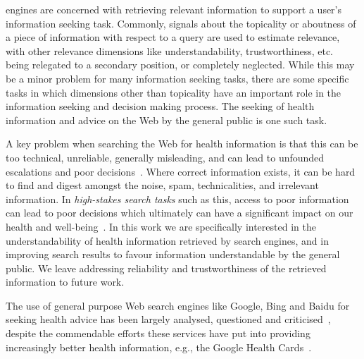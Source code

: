 
 engines are concerned with retrieving relevant information to support a user's information seeking task. Commonly, signals about the topicality or aboutness of a piece of information with respect to a query are used to estimate relevance, with other relevance dimensions like understandability, trustworthiness, etc.~\cite{zhang2014multidimensional} being relegated to a secondary position, or completely neglected. While this may be a minor problem for many information seeking tasks, there are some specific tasks in which dimensions other than topicality have an important role in the information seeking and decision making process. The seeking of health information and advice on the Web by the general public is one such task. 

A key problem when searching the Web for health information is that this can be too technical, unreliable, generally misleading, and can lead to unfounded escalations and poor decisions~\cite{white09b}. Where correct information exists, it can be hard to find and digest amongst the noise, spam, technicalities, and irrelevant information. In \textit{high-stakes search tasks} such as this, access to poor information can lead to poor decisions which ultimately can have a significant impact on our health and well-being~\cite{white09b,white13}. In this work we are specifically interested in the understandability of health information retrieved by search engines, and in improving search results to favour information understandable by the general public. We leave addressing reliability and trustworthiness of the retrieved information to future work.

The use of general purpose Web search engines like Google, Bing and Baidu for seeking health advice has been largely analysed, questioned and criticised~\cite{graber99,fitzsimmons10,wiener13,patel13,atcherson14,meillier17,ellimoottil12}, despite the commendable efforts these services have put into providing increasingly better health information, e.g., the Google Health Cards~\cite{gabrilovich2016cura}. 

